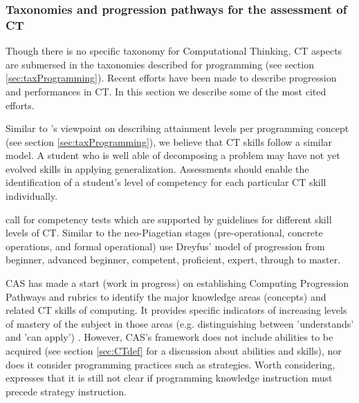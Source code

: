
\subsubsection{Taxonomies and progression pathways for the assessment of CT}
Though there is no specific taxonomy for Computational Thinking, CT aspects are submersed in the taxonomies described for programming (see section \ref{sec:taxProgramming}). Recent efforts have been made to describe progression and performances in CT. In this section we describe some of the most cited efforts.




Similar to 's viewpoint on describing attainment levels per programming concept (see section \ref{sec:taxProgramming}), we believe that CT skills follow a similar model. A student who is well able of decomposing a problem may have not yet evolved skills in applying generalization. Assessments should enable the identification of a student's level of competency for each particular CT skill individually.


 call for competency tests which are supported by guidelines for different skill levels of CT. Similar to the neo-Piagetian stages (pre-operational, concrete operations, and formal operational)  use Dreyfus' model of progression from beginner, advanced beginner, competent, proficient, expert, through to master.

CAS has made a start (work in progress) on establishing Computing Progression Pathways and rubrics \cite{Dorling2014CTprogressions} to identify the major knowledge areas (concepts) and related CT skills of computing. It provides specific indicators of increasing levels of mastery of the subject in those areas (e.g. distinguishing between 'understands' and 'can apply') \cite{Giordano2015}. However, CAS's framework does not include abilities to be acquired \cite{denning2017remaining} (see section \ref{sec:CTdef} for a discussion about abilities and skills), nor does it consider programming practices such as strategies. Worth considering,  expresses that it is still not clear if programming knowledge instruction must precede strategy instruction.


